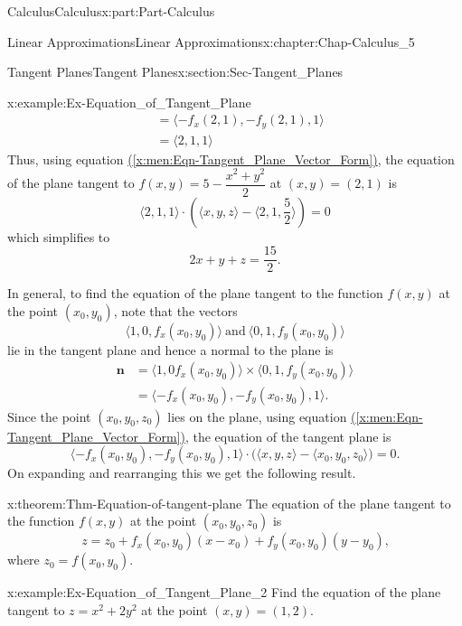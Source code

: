 \documentclass[oneside,10pt,]{book}
\newcommand{\xreffont}{\relax}
\numberwithin{equation}{section}
\newcommand{\bm}[1]{\boldsymbol{#1}}
\newcommand{\amp}{&}
\begin{document}
\begin{partptx}{Calculus}{}{Calculus}{}{}{x:part:Part-Calculus}
\begin{chapterptx}{Linear Approximations}{}{Linear Approximations}{}{}{x:chapter:Chap-Calculus_5}
\begin{sectionptx}{Tangent Planes}{}{Tangent Planes}{}{}{x:section:Sec-Tangent_Planes}
\begin{example}{}{x:example:Ex-Equation_of_Tangent_Plane}
\begin{align*}
\amp = \langle -f_x(2,1), -f_y(2,1), 1 \rangle\\
\amp = \langle 2,1,1 \rangle
\end{align*}
Thus, using equation \hyperref[x:men:Eqn-Tangent_Plane_Vector_Form]{({\xreffont\ref{x:men:Eqn-Tangent_Plane_Vector_Form}})}, the equation of the plane tangent to \(f(x,y) = 5 - \dfrac{x^2+y^2}{2}\) at \((x,y) = (2,1)\) is%
\begin{equation*}
\langle 2,1,1 \rangle \cdot \left( \langle x,y,z \rangle - \langle 2,1,\frac{5}{2} \rangle \right) = 0
\end{equation*}
which simplifies to%
\begin{equation*}
2x+y+z=\frac{15}{2}\text{.}
\end{equation*}
%
\end{example}
In general, to find the equation of the plane tangent to the function \(f(x,y)\) at the point \((x_0,y_0)\), note that the vectors%
\begin{equation*}
\langle 1, 0, f_x(x_0,y_0) \rangle \: \text{and} \: \langle 0,1,f_y(x_0,y_0) \rangle
\end{equation*}
lie in the tangent plane and hence a normal to the plane is%
\begin{align*}
\bm{n} \amp = \langle 1, 0 f_x(x_0,y_0) \rangle \times \langle0,1,f_y(x_0,y_0) \rangle\\
\amp = \langle -f_x(x_0,y_0), -f_y(x_0,y_0),1 \rangle\text{.}
\end{align*}
Since the point \((x_0,y_0,z_0)\) lies on the plane, using equation \hyperref[x:men:Eqn-Tangent_Plane_Vector_Form]{({\xreffont\ref{x:men:Eqn-Tangent_Plane_Vector_Form}})}, the equation of the tangent plane is%
\begin{equation*}
\langle  -f_x(x_0,y_0), -f_y(x_0,y_0),1 \rangle \cdot \bigg( \langle x,y,z \rangle - \langle x_0, y_0, z_0 \rangle \bigg) = 0.
\end{equation*}
On expanding and rearranging this we get the following result.%
\begin{theorem}{}{}{x:theorem:Thm-Equation-of-tangent-plane}%
The equation of the plane tangent to the function \(f(x,y)\) at the point \((x_0,y_0,z_0)\) is%
\begin{equation*}
z = z_0 + f_x(x_0,y_0) (x-x_0) + f_y(x_0,y_0) (y-y_0)\text{,}
\end{equation*}
where \(z_0 = f(x_0,y_0)\).%
\end{theorem}
\begin{example}{}{x:example:Ex-Equation_of_Tangent_Plane_2}%
Find the equation of the plane tangent to \(z = x^2+2y^2\) at the point \((x,y)=(1,2)\).%

\end{example}
\end{sectionptx}
\end{chapterptx}
\end{partptx}
\end{document}
